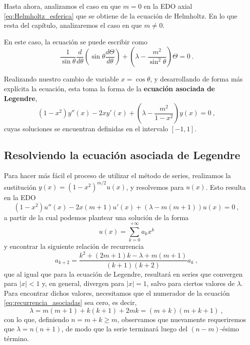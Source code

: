 Hasta ahora, analizamos el caso en que $m=0$ en la EDO axial \eqref{eq:Helmholtz_esferica} que se obtiene de la ecuación de Helmholtz. En lo que resta del capítulo, analizaremos el caso en que $m \neq 0$.

En este caso, la ecuación se puede escribir como
\begin{equation}
    \frac{1}{\sin\theta} \frac{d}{d\theta}\left( \sin\theta \frac{d\Theta}{d\theta} \right) + \left(\lambda - \frac{m^2}{\sin^2\theta} \right) \Theta = 0 \ .
\end{equation}

Realizando nuestro cambio de variable $x = \cos\theta$, y desarrollando de forma más explícita la ecuación, esta toma la forma de la \textbf{ecuación asociada de Legendre},
\begin{equation}
    (1-x^2) y''(x) - 2xy'(x) + \left( \lambda - \frac{m^2}{1-x^2} \right) y(x) = 0 \ ,
\end{equation}
cuyas soluciones se encuentran definidas en el intervalo $[-1,1]$.

\subsection{Resolviendo la ecuación asociada de Legendre}

Para hacer más fácil el proceso de utilizar el método de series, realizamos la sustitución $y(x) = (1-x^2)^{m/2} u(x)$, y resolvemos para $u(x)$. Esto resulta en la EDO
\begin{equation}
    (1-x^2)u''(x) - 2x(m+1)u'(x) + (\lambda - m(m+1))u(x) = 0 \ ,
\end{equation}
a partir de la cual podemos plantear una solución de la forma
\begin{equation}
    u(x) = \sum_{k=0}^{+\infty} a_k x^k 
\end{equation} 
y encontrar la siguiente relación de recurrencia
\begin{equation}\label{eq:recurrencia_asociadas}
    a_{k+2} = \frac{k^2 + (2m+1)k - \lambda + m(m+1)}{(k+1)(k+2)} a_k \ ,
\end{equation}
que al igual que para la ecuación de Legendre, resultará en series que convergen para $|x|<1$ y, en general, divergen para $|x|=1$, salvo para ciertos valores de $\lambda$. Para encontrar dichos valores, necesitamos que el numerador de la ecuación \eqref{eq:recurrencia_asociadas} sea cero, es decir,
\begin{equation}
    \lambda = m(m+1) + k(k+1) + 2mk = (m+k)(m+k+1) \ ,
\end{equation}
con lo que, definiendo $n = m+k \geq m$, observamos que nuevamente requeriremos que $\lambda = n(n+1)$, de modo que la serie terminará luego del $(n-m)$-ésimo término.

